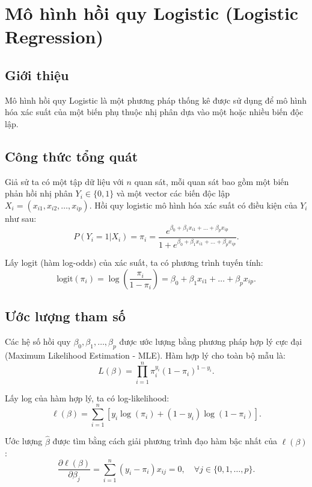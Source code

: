 \chapter{Mô hình hồi quy Logistic (Logistic Regression)}
\section{Giới thiệu}
Mô hình hồi quy Logistic là một phương pháp thống kê được sử dụng để mô hình hóa xác suất của một biến phụ thuộc nhị phân dựa vào một hoặc nhiều biến độc lập.

\section{Công thức tổng quát}
Giả sử ta có một tập dữ liệu với $n$ quan sát, mỗi quan sát bao gồm một biến phản hồi nhị phân $Y_i \in \{0,1\}$ và một vector các biến độc lập $X_i = (x_{i1}, x_{i2}, \dots, x_{ip})$. Hồi quy logistic mô hình hóa xác suất có điều kiện của $Y_i$ như sau:
\begin{equation}
P(Y_i = 1 | X_i) = \pi_i = \frac{e^{\beta_0 + \beta_1 x_{i1} + \dots + \beta_p x_{ip}}}{1 + e^{\beta_0 + \beta_1 x_{i1} + \dots + \beta_p x_{ip}}}.
\end{equation}

Lấy logit (hàm log-odds) của xác suất, ta có phương trình tuyến tính:
\begin{equation}
\text{logit}(\pi_i) = \log\left( \frac{\pi_i}{1 - \pi_i} \right) = \beta_0 + \beta_1 x_{i1} + \dots + \beta_p x_{ip}.
\end{equation}

\section{Ước lượng tham số}
Các hệ số hồi quy $\beta_0, \beta_1, \dots, \beta_p$ được ước lượng bằng phương pháp hợp lý cực đại (Maximum Likelihood Estimation - MLE). Hàm hợp lý cho toàn bộ mẫu là:
\begin{equation}
L(\beta) = \prod_{i=1}^{n} \pi_i^{y_i} (1 - \pi_i)^{1 - y_i}.
\end{equation}

Lấy log của hàm hợp lý, ta có log-likelihood:
\begin{equation}
\ell(\beta) = \sum_{i=1}^{n} \left[ y_i \log(\pi_i) + (1 - y_i) \log(1 - \pi_i) \right].
\end{equation}

Ước lượng $\hat{\beta}$ được tìm bằng cách giải phương trình đạo hàm bậc nhất của $\ell(\beta)$:
\begin{equation}
\frac{\partial \ell(\beta)}{\partial \beta_j} = \sum_{i=1}^{n} (y_i - \pi_i) x_{ij} = 0, \quad \forall j \in \{0, 1, \dots, p\}.
\end{equation}


